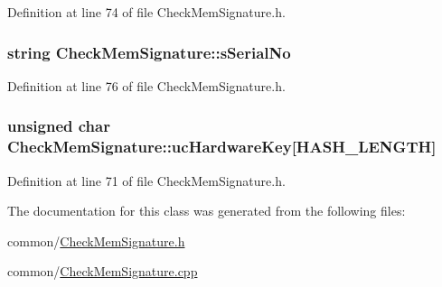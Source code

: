 \-Definition at line 74 of file \-Check\-Mem\-Signature.\-h.

\hypertarget{class_check_mem_signature_adcd4f7e90f5a03d961560db27fd713b3}{
\subsubsection[{s\-Serial\-No}]{\setlength{\rightskip}{0pt plus 5cm}string {\bf \-Check\-Mem\-Signature\-::s\-Serial\-No}}}\label{class_check_mem_signature_adcd4f7e90f5a03d961560db27fd713b3}


\-Definition at line 76 of file \-Check\-Mem\-Signature.\-h.

\hypertarget{class_check_mem_signature_afc2a181bcd1a9253d9b830371a05d5b6}{
\subsubsection[{uc\-Hardware\-Key}]{\setlength{\rightskip}{0pt plus 5cm}unsigned char {\bf \-Check\-Mem\-Signature\-::uc\-Hardware\-Key}\mbox{[}{\bf \-H\-A\-S\-H\-\_\-\-L\-E\-N\-G\-T\-H}\mbox{]}}}\label{class_check_mem_signature_afc2a181bcd1a9253d9b830371a05d5b6}


\-Definition at line 71 of file \-Check\-Mem\-Signature.\-h.



\-The documentation for this class was generated from the following files\-:\begin{DoxyCompactItemize}
\item 
common/\hyperlink{_check_mem_signature_8h}{\-Check\-Mem\-Signature.\-h}\item 
common/\hyperlink{_check_mem_signature_8cpp}{\-Check\-Mem\-Signature.\-cpp}\end{DoxyCompactItemize}

